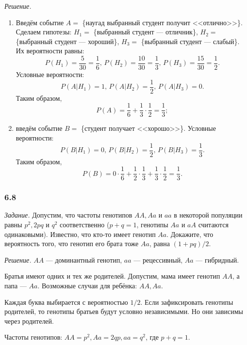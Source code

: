 \textit{Решение.}
\begin{enumerate}[label=\alph*)]
\item Введём событие $A =$ \{наугад выбранный студент получит <<отлично>>\}.
Сделаем гипотезы: $H_1 =$ \{выбранный студент --- отличник\},
$H_2 =$ \{выбранный студент --- хороший\}, $H_3 =$ \{выбранный студент --- слабый\}.
Их вероятности равны:
$$P \left( H_1 \right) =
\frac{5}{30} =
\frac{1}{6}, \,
P \left( H_2 \right) =
\frac{10}{30} =
\frac{1}{3}, \,
P \left( H_3 \right) =
\frac{15}{30} =
\frac{1}{2}.$$
Условные вероятности:
$$P \left( \left. A \right| H_1 \right) =
1, \,
P \left( \left. A \right| H_2 \right) =
\frac{1}{2}, \,
P \left( \left. A \right| H_3 \right) =
0.$$
Таким образом,
$$P \left( A \right) =
\frac{1}{6} + \frac{1}{3} \cdot \frac{1}{2} =
\frac{1}{3};$$
\item введём событие $B =$ \{студент получает <<хорошо>>\}.
Условные вероятности:
$$P \left( \left. B \right| H_1 \right) =
0, \,
P \left( \left. B \right| H_2 \right) =
\frac{1}{2}, \,
P \left( \left. B \right| H_3 \right) =
\frac{1}{3}.$$
Таким образом,
$$P \left( B \right) =
0 \cdot \frac{1}{6} + \frac{1}{2} \cdot \frac{1}{3} + \frac{1}{3} \cdot \frac{1}{2} =
\frac{1}{3}.$$
\end{enumerate}

\subsubsection*{6.8}

\textit{Задание.}
Допустим,
что частоты генотипов $AA, Aa$ и $aa$ в некоторой популяции равны $p^2, 2pq$ и $q^2$ соответственно ($p+q = 1$,
генотипы $Aa$ и $aA$ считаются одинаковыми).
Известно, что кто-то имеет генотип $Aa$.
Докажите, что вероятность того, что генотип его брата тоже $Aa$, равна $ \left( 1+pq \right) /2$.

\textit{Решение.} $AA$ --- доминантный генотип, $aa$ --- рецессивный, $Aa$ --- гибридный.

Братья имеют одних и тех же родителей.
Допустим, мама имеет генотип $AA$, а папа --- $Aa$.
Возможные случаи для ребёнка: $AA, Aa$.

Каждая буква выбирается с вероятностью $1/2$.
Если зафиксировать генотипы родителей, то генотипы братьев будут условно независимыми.
Но они зависимы через родителей.

Частоты генотипов: $AA = p^2, Aa = 2qp, aa = q^2$, где $p + q = 1$.


